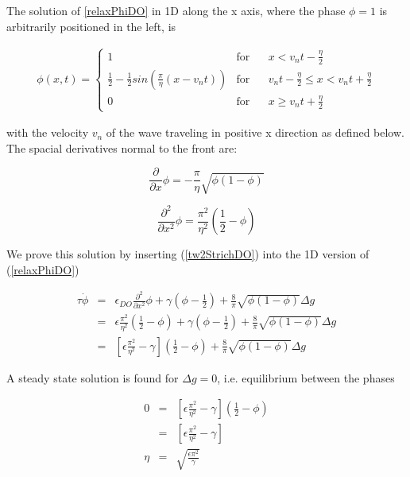 The solution of \ref{relaxPhiDO} in 1D along the x axis, where the phase $\phi = 1$ is arbitrarily positioned in the left, is

\begin{eqnarray}
  \label{travellingWaveDO}
  \phi(x,t) =\begin{cases} 1 &\mbox{for}\;\;\;\;\;\;x<v_nt-\frac\eta2\\ \frac 1 2 - \frac 12 sin(\frac\pi\eta(x-v_n t))&\mbox{for}\;\;\;\;\;\;v_nt-\frac\eta2\le x<v_nt+\frac\eta2\\ 0 &\mbox{for}\;\;\;\;\;\;x \ge v_nt+\frac\eta2 \end{cases}
\end{eqnarray}

with the velocity $v_n$ of the wave traveling in positive x direction as defined below. The spacial derivatives normal to the front are:

\begin{equation}
  \label{twStrichDO}
   \frac \partial {\partial x}\phi = - \frac \pi \eta \sqrt{\phi(1-\phi)}
\end{equation}

\begin{equation}
  \label{tw2StrichDO}
   \frac {\partial^2} {\partial x^2}\phi = \frac{\pi^2}{\eta^2}(\frac12-\phi)
\end{equation}

We prove this solution by inserting (\ref{tw2StrichDO}) into the 1D version of (\ref{relaxPhiDO})

\begin{eqnarray}
\label{prove}
  \tau \dot{\phi} &=& \epsilon_{DO} \frac {\partial^2} {\partial x^2} \phi + \gamma(\phi-\frac12) + \frac8\pi\sqrt{\phi(1-\phi)} \Delta g \\
&=& \epsilon \frac{\pi^2}{\eta^2}(\frac12-\phi) + \gamma(\phi-\frac12) + \frac8\pi\sqrt{\phi(1-\phi)} \Delta g\\
&=& [\epsilon \frac{\pi^2}{\eta^2}- \gamma](\frac12-\phi) + \frac8\pi\sqrt{\phi(1-\phi)} \Delta g
\end{eqnarray}

A steady state solution is found for $\Delta g = 0$, i.e. equilibrium between the phases

\begin{eqnarray}
\label{prove2}
   0 &=& [\epsilon \frac{\pi^2}{\eta^2}- \gamma](\frac12-\phi) \\
     &=& [\epsilon \frac{\pi^2}{\eta^2}- \gamma] \\
   \eta &=& \sqrt{\frac {\epsilon {\pi^2}}{\gamma}}
\end{eqnarray}

